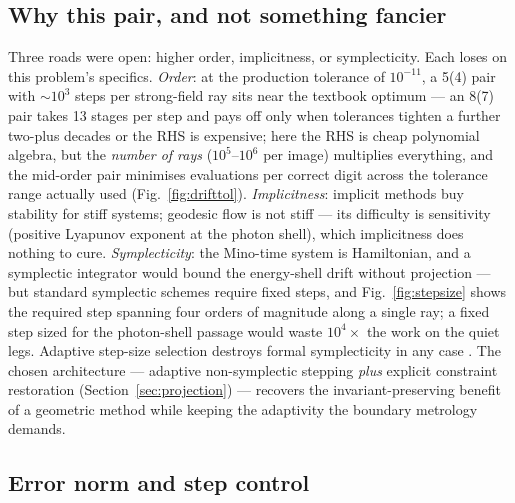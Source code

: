 \subsection{Why this pair, and not something fancier}

Three roads were open: higher order, implicitness, or symplecticity.
Each loses on this problem's specifics. \emph{Order}: at the production
tolerance of $10^{-11}$, a 5(4) pair with $\sim$$10^3$ steps per
strong-field ray sits near the textbook optimum — an 8(7) pair
\citep[e.g.][]{HairerNorsettWanner1993} takes 13 stages per step and
pays off only when tolerances tighten a further two-plus decades or
the RHS is expensive; here the RHS is cheap polynomial algebra, but
the \emph{number of rays} ($10^5$--$10^6$ per image) multiplies
everything, and the mid-order pair minimises evaluations per correct
digit across the tolerance range actually used
(Fig.~\ref{fig:drifttol}). \emph{Implicitness}: implicit methods buy
stability for stiff systems; geodesic flow is not stiff — its
difficulty is sensitivity (positive Lyapunov exponent at the photon
shell), which implicitness does nothing to cure. \emph{Symplecticity}:
the Mino-time system is Hamiltonian, and a symplectic integrator would
bound the energy-shell drift without projection — but standard
symplectic schemes require fixed steps, and Fig.~\ref{fig:stepsize}
shows the required step spanning four orders of magnitude along a
single ray; a fixed step sized for the photon-shell passage would
waste $10^4\times$ the work on the quiet legs. Adaptive
step-size selection destroys formal symplecticity in any case
\citep{HairerNorsettWanner1993}. The chosen architecture — adaptive
non-symplectic stepping \emph{plus} explicit constraint restoration
(Section~\ref{sec:projection}) — recovers the invariant-preserving
benefit of a geometric method while keeping the adaptivity the
boundary metrology demands.

\subsection{Error norm and step control}

